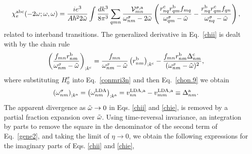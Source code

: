 \documentclass[floatfix,prb,aps,superscriptaddress,11pt,preprint,letterpaper]{revtex4}
\def\chon{black}
\begin{document}
\begin{equation}\label{chie}
\chi^{\mathrm{a}\mathrm{b}\mathrm{c}}_e (-2\omega;\omega,\omega)
=\frac{ie^3}{A\hbar^22\tilde\omega}
\int \frac{dk^3}{8\pi^3}
\sum_{qmn}
\frac{{\mathbf{\cal V}}_{mn}^{\sigma,\mathrm{a}}}{\omega^\sigma_{nm}-2\tilde\omega}
\left(
\frac{r_{nq}^{\mathrm{c}} r_{qm}^{\mathrm{b}} 
f_{mq}}{\omega^\sigma_{qm}-\tilde\omega}
-\frac{r_{nq}^{\mathrm{b}} r_{qm}^{\mathrm{c}} 
f_{qn}}{\omega^\sigma_{nq}-\tilde\omega}
\right),
\end{equation} 
{\color{\chon} related} to interband transitions.
The generalized derivative in Eq.~\eqref{chii} is dealt with by the chain rule 
\begin{equation}\label{gene2}
\left(\frac{f_{mn}r_{nm}^{\mathrm{b}}}{\omega^\sigma_{nm}-\tilde\omega}\right)_{;k^{\mathrm{c}}}=
\frac{f_{mn}}{\omega^\sigma_{nm}-\tilde\omega}\left(r_{nm}^{\mathrm{b}}\right)_{;k^{\mathrm{c}}}
-\frac{f_{mn}r_{nm}^{\mathrm{b}}\Delta_{nm}^{\mathrm{c}}}{(\omega^\sigma_{nm}-\tilde\omega)^2}
,
\end{equation}
where {\color{\chon} substituting} $H^\sigma_0$ 
into Eq.~\eqref{conmri3n} and then
Eq.~\eqref{chon.9}
{\color{\chon} we obtain}
\begin{align}\label{eli.13}
\left(\omega^\sigma_{nm}\right)_{;k^{\mathrm{a}}}
=
\left(\omega^{\mathrm{LDA}}_{nm}\right)_{;k^{\mathrm{a}}}
= 
v_{nn}^{\mathrm{LDA},\mathrm{a}}-v_{mm}^{\mathrm{LDA},\mathrm{a}}\equiv\Delta_{nm}^{\mathrm{a}}
.
\end{align} 
The apparent divergence as $\tilde\omega\to 0$
in Eqs. \eqref{chii} and \eqref{chie},  
is removed  by
 a partial fraction expansion over $\tilde\omega$. 
Using time-reversal invariance, an integration by parts to 
remove the square in the denominator of the second term of Eq.~\eqref{gene2}, 
and taking the limit of $\eta\to 0$, 
we obtain the following expressions for the imaginary parts of 
Eqs. \eqref{chii} and \eqref{chie}, 
\end{document}
